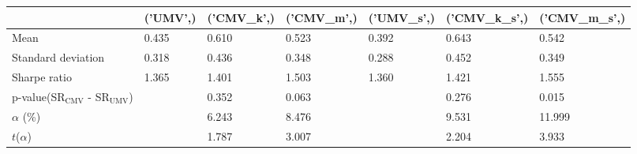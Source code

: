 \begin{tabular}{lllllll}
\toprule
 & ('UMV',) & ('CMV_k',) & ('CMV_m',) & ('UMV_s',) & ('CMV_k_s',) & ('CMV_m_s',) \\
\midrule
Mean & 0.435 & 0.610 & 0.523 & 0.392 & 0.643 & 0.542 \\
Standard deviation & 0.318 & 0.436 & 0.348 & 0.288 & 0.452 & 0.349 \\
Sharpe ratio & 1.365 & 1.401 & 1.503 & 1.360 & 1.421 & 1.555 \\
p-value(SR$_{\text{CMV}}$ - SR$_{\text{UMV}}$) &  & 0.352 & 0.063 &  & 0.276 & 0.015 \\
$\alpha$ (\%) &  & 6.243 & 8.476 &  & 9.531 & 11.999 \\
$t$($\alpha$) &  & 1.787 & 3.007 &  & 2.204 & 3.933 \\
\bottomrule
\end{tabular}
